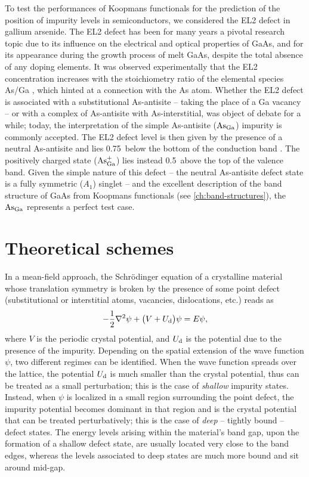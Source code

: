 To test the performances of Koopmans functionals for the prediction of the position of impurity levels in semiconductors, we considered the EL2 defect in gallium arsenide. The EL2 defect has been for many years a pivotal research topic due to its influence on the electrical and optical properties of GaAs, and for its appearance during the growth process of melt GaAs, despite the total absence of any doping elements. It was observed experimentally that the EL2 concentration increases with the stoichiometry ratio of the elemental species As/Ga \cite{kaminska_el2_1987}, which hinted at a connection with the As atom. Whether the EL2 defect is associated with a substitutional As-antisite -- taking the place of a Ga vacancy -- or with a complex of As-antisite with As-interstitial, was object of debate for a while; today, the interpretation of the simple As-antisite ($\rm As_{Ga}$) impurity is commonly accepted. The EL2 defect level is then given by the presence of a neutral As-antisite and lies 0.75~\mev below the bottom of the conduction band \cite{kaminska_el2_1987,dabrowski_isolated_1989}. The positively charged state ($\rm As_{Ga}^+$) lies instead 0.5~\mev above the top of the valence band. Given the simple nature of this defect -- the neutral As-antisite defect state is a fully symmetric ($A_1$) singlet -- and the excellent description of the band structure of GaAs from Koopmans functionals (see \cref{ch:band-structures}), the $\rm As_{Ga}$ represents a perfect test case.

\section{Theoretical schemes\label{sec:theory-defects}}
In a mean-field approach, the Schr\"{o}dinger equation of a crystalline material whose translation symmetry is broken by the presence of some point defect (substitutional or interstitial atoms, vacancies, dislocations, etc.) reads as
%
\begin{equation}
    -\frac{1}{2} \nabla^2 \psi + \big( V + U_{\rm d } \big) \psi = E \psi ,
    \label{eq:schrodinger-eq-defects}
\end{equation}
%
where $V$ is the periodic crystal potential, and $U_{\rm d}$ is the potential due to the presence of the impurity. Depending on the spatial extension of the wave function $\psi$, two different regimes can be identified. When the wave function spreads over the lattice, the potential $U_{\rm d}$ is much smaller than the crystal potential, thus can be treated as a small perturbation; this is the case of \emph{shallow} impurity states. Instead, when $\psi$ is localized in a small region surrounding the point defect, the impurity potential becomes dominant in that region and is the crystal potential that can be treated perturbatively; this is the case of \emph{deep} -- tightly bound -- defect states. The energy levels arising within the material's band gap, upon the formation of a shallow defect state, are usually located very close to the band edges, whereas the levels associated to deep states are much more bound and sit around mid-gap.

